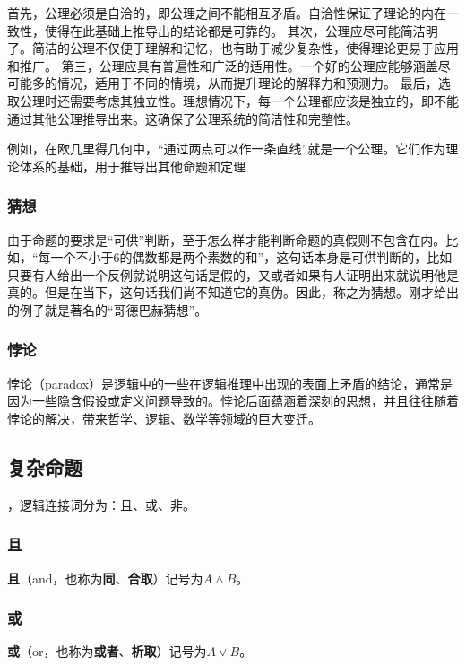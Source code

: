 首先，公理必须是自洽的，即公理之间不能相互矛盾。自洽性保证了理论的内在一致性，使得在此基础上推导出的结论都是可靠的。
其次，公理应尽可能简洁明了。简洁的公理不仅便于理解和记忆，也有助于减少复杂性，使得理论更易于应用和推广。
第三，公理应具有普遍性和广泛的适用性。一个好的公理应能够涵盖尽可能多的情况，适用于不同的情境，从而提升理论的解释力和预测力。
最后，选取公理时还需要考虑其独立性。理想情况下，每一个公理都应该是独立的，即不能通过其他公理推导出来。这确保了公理系统的简洁性和完整性。


例如，在欧几里得几何中，“通过两点可以作一条直线”就是一个公理。它们作为理论体系的基础，用于推导出其他命题和定理 

\subsubsection{猜想}

由于命题的要求是“可供”判断，至于怎么样才能判断命题的真假则不包含在内。比如，“每一个不小于6的偶数都是两个素数的和”，这句话本身是可供判断的，比如只要有人给出一个反例就说明这句话是假的，又或者如果有人证明出来就说明他是真的。但是在当下，这句话我们尚不知道它的真伪。因此，称之为猜想。刚才给出的例子就是著名的“哥德巴赫猜想”。

\subsubsection{悖论}

悖论（paradox）是逻辑中的一些在逻辑推理中出现的表面上矛盾的结论，通常是因为一些隐含假设或定义问题导致的。悖论后面蕴涵着深刻的思想，并且往往随着悖论的解决，带来哲学、逻辑、数学等领域的巨大变迁。

\subsection{复杂命题}\label{sub_HsLogi_1}

，逻辑连接词分为：且、或、非。

\subsubsection{且}

\textbf{且}（and，也称为\textbf{同}、\textbf{合取}）记号为$A\land B$。

\subsubsection{或}

\textbf{或}（or，也称为\textbf{或者}、\textbf{析取}）记号为$A\lor B$。


